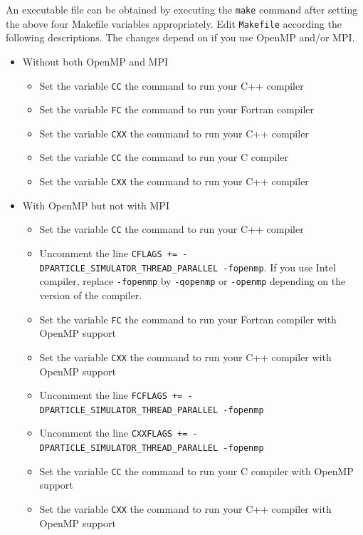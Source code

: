 An executable file can be obtained by executing the \texttt{make} command after setting the above four Makefile variables appropriately. Edit \texttt{Makefile} according the following descriptions. The changes depend on if you use OpenMP and/or MPI.
\endifC %

\begin{itemize}  
\item Without both OpenMP and MPI
\begin{itemize}
\ifCpp %
\item Set the variable \texttt{CC} the command to run your C++ compiler
\endifCpp
\ifFtn %
\item Set the variable \texttt{FC} the command to run your Fortran compiler
\item Set the variable \texttt{CXX} the command to run your C++ compiler
\endifFtn
\ifC %
\item Set the variable \texttt{CC} the command to run your C compiler
\item Set the variable \texttt{CXX} the command to run your C++ compiler
\endifC
\end{itemize}
\item With OpenMP but not with MPI
\begin{itemize}
\ifCpp %
\item Set the variable \texttt{CC} the command to run your C++ compiler
\item Uncomment the line \texttt{CFLAGS += -DPARTICLE\_SIMULATOR\_THREAD\_PARALLEL -fopenmp}. If you use Intel compiler, replace \texttt{-fopenmp} by \texttt{-qopenmp} or \texttt{-openmp} depending on the version of the compiler.
\endifCpp
\ifFtn %
\item Set the variable \texttt{FC} the command to run your Fortran compiler with OpenMP support
\item Set the variable \texttt{CXX} the command to run your C++ compiler with OpenMP support
\item Uncomment the line \texttt{FCFLAGS += -DPARTICLE\_SIMULATOR\_THREAD\_PARALLEL -fopenmp}
\item Uncomment the line \texttt{CXXFLAGS += -DPARTICLE\_SIMULATOR\_THREAD\_PARALLEL -fopenmp}
\endifFtn
\ifC %
\item Set the variable \texttt{CC} the command to run your C compiler with OpenMP support
\item Set the variable \texttt{CXX} the command to run your C++ compiler with OpenMP support

\end{itemize}
\end{itemize}
